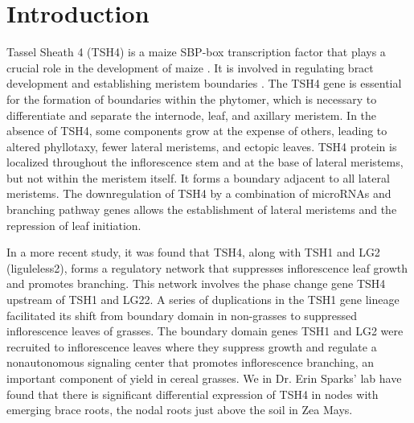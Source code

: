 %
%



\author{Joseph Cristiano}
\date{May 2024}

\section{Introduction}
Tassel Sheath 4 (TSH4) is a maize SBP-box transcription factor that plays a crucial role in the development of maize \cite{Chuck2010}. It is involved in regulating bract development and establishing meristem boundaries \cite{Chuck2010}. The TSH4 gene is essential for the formation of boundaries within the phytomer, which is necessary to differentiate and separate the internode, leaf, and axillary meristem\cite{Chuck2010}. In the absence of TSH4, some components grow at the expense of others, leading to altered phyllotaxy, fewer lateral meristems, and ectopic leaves\cite{Chuck2010}. TSH4 protein is localized throughout the inflorescence stem and at the base of lateral meristems, but not within the meristem itself\cite{Chuck2010}. It forms a boundary adjacent to all lateral meristems\cite{Chuck2010}. The downregulation of TSH4 by a combination of microRNAs and branching pathway genes allows the establishment of lateral meristems and the repression of leaf initiation\cite{Chuck2010}.

In a more recent study, it was found that TSH4, along with TSH1 and LG2 (liguleless2), forms a regulatory network that suppresses inflorescence leaf growth and promotes branching\cite{Xiao2022}. This network involves the phase change gene TSH4 upstream of TSH1 and LG22. A series of duplications in the TSH1 gene lineage facilitated its shift from boundary domain in non-grasses to suppressed inflorescence leaves of grasses\cite{Xiao2022}. The boundary domain genes TSH1 and LG2 were recruited to inflorescence leaves where they suppress growth and regulate a nonautonomous signaling center that promotes inflorescence branching, an important component of yield in cereal grasses\cite{Xiao2022}. 
We in Dr. Erin Sparks' lab have found that there is significant differential expression of TSH4 in nodes with emerging brace roots, the nodal roots just above the soil in Zea Mays.


